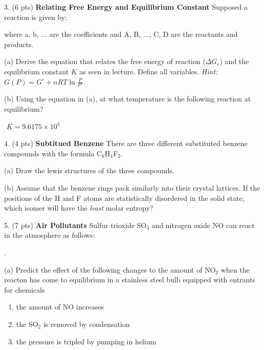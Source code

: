 \documentclass[11pt]{article}
\begin{document}
\vspace{3in}

3. (6 pts) \textbf{Relating Free Energy and Equilibrium Constant} Supposed a reaction
is given by:
\begin{center}
\end{center}
where a, b, ... are the coefficients and A, B, ..., C, D are the reactants and products.

(a) Derive the equation that relates the free energy of reaction ($\Delta G_r$) and the
equilibrium constant $K$ as seen in lecture. Define all variables. \textit{Hint:}
$G(P) = G^\circ + nRT \ln\frac{P}{P^\circ}$.

(b) Using the equation in (a), at what temperature is the following reaction at equilibrium?
\begin{center}
   $\,\, K = 9.6175 \times 10^4$
\end{center}


\vspace{3in}

%
%

4. (4 pts) \textbf{Subtitued Benzene} There are three different substituted benzene compounds
with the formula C$_6$H$_4$F$_2$.

(a) Draw the lewis structures of the three compounds.

(b) Assume that the benzene rings pack similarly into their crystal lattices. If the positions
of the H and F atoms are statistically disordered in the solid state, which isomer will have
the \textit{least} molar entropy?

\vspace{3in}

5. (7 pts) \textbf{Air Pollutants} Sulfur trioxide SO$_3$ and nitrogen oxide NO can react in
the atmosphere as follows:
\begin{center}
  .
\end{center}
(a) Predict the effect of the following changes to the amount of NO$_2$ when the reacton
has come to equilibrium in a stainless steel bulb equipped with entrants for chemicals
\begin{enumerate}
\item the amount of NO increases
\item the SO$_2$ is removed by condensation
\item the pressure is tripled by pumping in helium
\end{enumerate}
\end{document}
